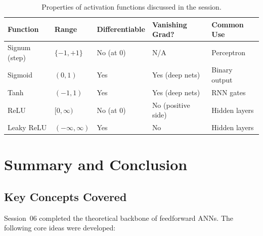 \documentclass[12pt,a4paper]{article}
\begin{document}
\begin{table}[htbp]
\centering
\caption{Properties of activation functions discussed in the session.}
\label{tab:activations}
\begin{tabularx}{\linewidth}{lXXXX}
\toprule
\textbf{Function} & \textbf{Range} & \textbf{Differentiable} & \textbf{Vanishing Grad?} & \textbf{Common Use} \\
\midrule
Signum (step) & $\{-1,+1\}$ & No (at 0) & N/A & Perceptron \\
Sigmoid & $(0,1)$ & Yes & Yes (deep nets) & Binary output \\
Tanh & $(-1,1)$ & Yes & Yes (deep nets) & RNN gates \\
ReLU & $[0,\infty)$ & No (at 0) & No (positive side) & Hidden layers \\
Leaky ReLU & $(-\infty,\infty)$ & Yes & No & Hidden layers \\
\bottomrule
\end{tabularx}
\end{table}

\section{Summary and Conclusion}
\label{sec:summary}

\subsection{Key Concepts Covered}

Session~06 completed the theoretical backbone of feedforward ANNs.  The
following core ideas were developed:
\end{document}
